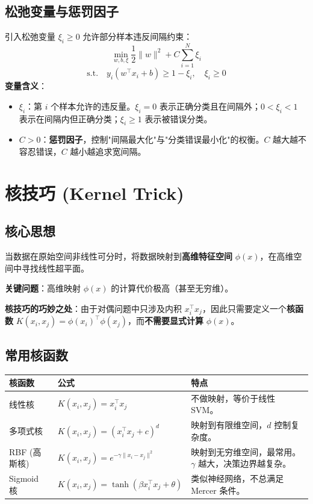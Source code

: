 \documentclass[12pt, a4paper]{book}
\begin{document}
\subsection{松弛变量与惩罚因子}
引入松弛变量 $\xi_i \geq 0$ 允许部分样本违反间隔约束：
$$ \min_{w, b, \xi} \frac{1}{2}\|w\|^2 + C \sum_{i=1}^N \xi_i $$
$$ \text{s.t.} \quad y_i(w^\top x_i + b) \geq 1 - \xi_i, \quad \xi_i \geq 0 $$
\textbf{变量含义}：
\begin{itemize}
    \item $\xi_i$：第 $i$ 个样本允许的违反量。$\xi_i = 0$ 表示正确分类且在间隔外；$0 < \xi_i < 1$ 表示在间隔内但正确分类；$\xi_i \geq 1$ 表示被错误分类。
    \item $C > 0$：\textbf{惩罚因子}，控制"间隔最大化"与"分类错误最小化"的权衡。$C$ 越大越不容忍错误，$C$ 越小越追求宽间隔。
\end{itemize}

\section{核技巧 (Kernel Trick)}

\subsection{核心思想}
当数据在原始空间非线性可分时，将数据映射到\textbf{高维特征空间} $\phi(x)$，在高维空间中寻找线性超平面。

\textbf{关键问题}：高维映射 $\phi(x)$ 的计算代价极高（甚至无穷维）。

\textbf{核技巧的巧妙之处}：由于对偶问题中只涉及内积 $x_i^\top x_j$，因此只需要定义一个\textbf{核函数} $K(x_i, x_j) = \phi(x_i)^\top \phi(x_j)$，而\textbf{不需要显式计算} $\phi(x)$。

\subsection{常用核函数}
\begin{table}[h]
\centering
\begin{tabularx}{\textwidth}{|l|l|X|}
\hline
\textbf{核函数} & \textbf{公式} & \textbf{特点} \\
\hline
线性核 & $K(x_i, x_j) = x_i^\top x_j$ & 不做映射，等价于线性 SVM。 \\
\hline
多项式核 & $K(x_i, x_j) = (x_i^\top x_j + c)^d$ & 映射到有限维空间，$d$ 控制复杂度。 \\
\hline
RBF (高斯核) & $K(x_i, x_j) = e^{-\gamma \|x_i - x_j\|^2}$ & 映射到无穷维空间，最常用。$\gamma$ 越大，决策边界越复杂。 \\
\hline
Sigmoid 核 & $K(x_i, x_j) = \tanh(\beta x_i^\top x_j + \theta)$ & 类似神经网络，不总满足 Mercer 条件。 \\
\hline
\end{tabularx}
\end{table}
\end{document}
